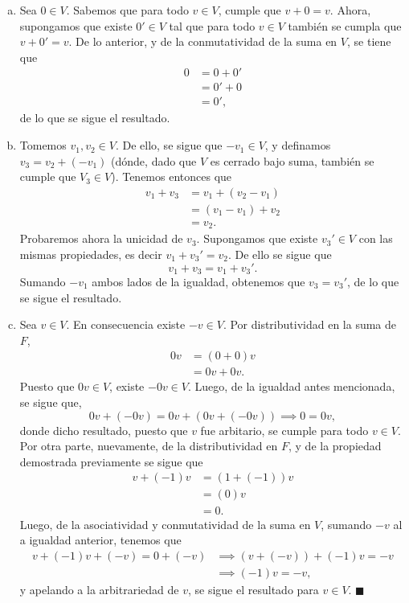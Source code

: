 \documentclass[11pt]{scrartcl}
\begin{document}
    \begin{enumerate}[a)]
        \item Sea $0\in V$. Sabemos que para todo $v\in V$, cumple que $v+0=v$. Ahora, supongamos que existe $0'\in V$ 
        tal que para todo $v\in V$ también se cumpla que $v+0'=v$. De lo anterior, y de la conmutatividad de la suma en $V$, se tiene que
        \begin{align*}
            0&=0+0' \\
            &=0'+0 \\
            &=0',
       \end{align*}
       de lo que se sigue el resultado.
       \item Tomemos $v_1,v_2\in V$. De ello, se sigue que $-v_1\in V$, y definamos $v_3=v_2+(-v_1)$ (dónde, dado que $V$ es cerrado bajo suma, también se cumple que $V_3 \in V$).
       Tenemos entonces que
       \begin{align*}
            v_1+v_3&=v_1+(v_2-v_1) \\
            &=(v_1-v_1)+v_2 \\
            &=v_2.
       \end{align*}
       Probaremos ahora la unicidad de $v_3$. Supongamos que existe $v_3' \in V$ con las mismas propiedades, es decir $v_1+v_3'=v_2$. De ello se sigue que
       \[
       v_1+v_3=v_1+v_3'.
       \]
       Sumando $-v_1$ ambos lados de la igualdad, obtenemos que $v_3=v_3'$, de lo que se sigue el resultado.
       \item Sea $v \in V$. En consecuencia existe $-v\in V$. Por distributividad en la suma de $F$, 
       \begin{align*}
        0v &= (0+0)v \\
        &= 0v+0v.
       \end{align*}
       Puesto que $0v\in V$, existe $-0v\in V$. Luego, de la igualdad antes mencionada, se sigue que,
       \[
       0v+(-0v)=0v+(0v+(-0v)) \implies 0=0v,
       \]
       donde dicho resultado, puesto que $v$ fue arbitario, se cumple para todo $v \in V$. Por otra parte, nuevamente,
       de la distributividad en $F$, y de la propiedad demostrada previamente se sigue que
       \begin{align*}
            v+(-1)v&=(1+(-1))v \\
            &=(0)v \\
            &=0.
       \end{align*}
       Luego, de la asociatividad y conmutatividad de la suma en $V$, sumando $-v$ al a igualdad anterior, tenemos que
       \begin{align*}
            v+(-1)v+(-v)=0+(-v) &\implies (v+(-v))+(-1)v=-v \\
            &\implies (-1)v=-v,
       \end{align*}
       y apelando a la arbitrariedad de $v$, se sigue el resultado para $v \in V$. $\blacksquare$
    \end{enumerate}
\end{document}
